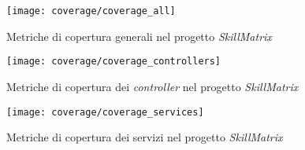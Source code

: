 \begin{figure}[!h] 
    \centering 
    \texttt{[image: coverage/coverage\_all]} 
    \caption{Metriche di copertura generali nel progetto \emph{SkillMatrix}}
\end{figure}

\begin{figure}[!h] 
    \centering 
    \texttt{[image: coverage/coverage\_controllers]} 
    \caption{Metriche di copertura dei \emph{controller} nel progetto \emph{SkillMatrix}}
\end{figure}

\begin{figure}[!h] 
    \centering 
    \texttt{[image: coverage/coverage\_services]} 
    \caption{Metriche di copertura dei servizi nel progetto \emph{SkillMatrix}}
\end{figure}

